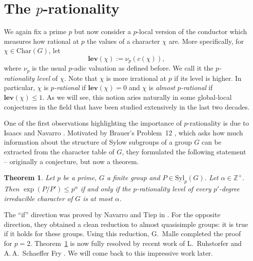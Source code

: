 \documentclass[12pt]{amsart}
\newtheorem{theorem}{Theorem}[section]
\theoremstyle{definition}
\numberwithin{equation}{section}
\newcommand{\Syl}{{\mathrm {Syl}}}
\newcommand{\Char}{{\mathrm {Char}}}
\newcommand{\ZZ}{{\mathbb Z}}
\newcommand{\lev}{\mathrm{\mathbf{lev}}}
\begin{document}

\section{The $p$-rationality}\label{sec:p-rationality}

We again fix a prime $p$ but now consider a $p$-local version of the
conductor which measures how rational at $p$ the values of a
character $\chi$ are. More specifically, for $\chi\in\Char(G)$, let
\[
\lev(\chi):=\nu_p(c(\chi)),
\]
where $\nu_p$ is the usual $p$-adic valuation as defined before. We
call it the \emph{$p$-rationality level} of $\chi$. Note that $\chi$
is more irrational at $p$ if its level is higher. In particular,
$\chi$ is \emph{$p$-rational} if $\lev(\chi)=0$ and $\chi$ is
\emph{almost $p$-rational} if $\lev(\chi)\leq 1$. As we will see,
this notion aries naturally in some global-local conjectures in the
field that have been studied extensively in the last two decades.



One of the first observations highlighting the importance of
$p$-rationality is due to Isaacs and Navarro
\cite{Isaacs-Navarro01}. Motivated by Brauer's Problem~12
\cite{Brauer63}, which asks how much information about the structure
of Sylow subgroups of a group $G$ can be extracted from the
character table of $G$, they formulated the following statement --
originally a conjecture, but now a theorem.



\begin{theorem}\label{IN01}
Let $p$ be a prime, $G$ a finite group and $P\in\Syl_p(G)$. Let
$\alpha\in\ZZ^{+}$. Then $\exp(P/P')\leq p^\alpha$ if and only if
the $p$-rationality level of every $p'$-degree irreducible character
of $G$ is at most $\alpha$.
\end{theorem}

The ``if'' direction was proved by Navarro and Tiep in
\cite[Theorem~B]{Navarro-Tiep19}. For the opposite direction, they
obtained a clean reduction to almost quasisimple groups: it is true
if it holds for these groups. Using this reduction, G.~Malle
\cite{Malle19} completed the proof for $p=2$. Theorem~\ref{IN01} is
now fully resolved by recent work of L.~Ruhstorfer and
A.\,A.~Schaeffer Fry \cite{RS25}. We will come back to this
impressive work later.
\end{document}
